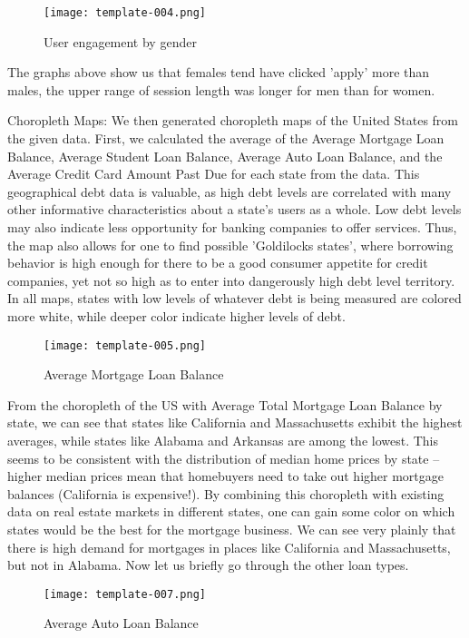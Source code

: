 \documentclass[11pt]{llncs}
\begin{document}
\begin{figure}
\begin{center}
\texttt{[image: template-004.png]}
\caption{User engagement by gender}
\end{center}
\end{figure}

The graphs above show us that females tend have clicked 'apply' more than males, the upper range of session length was longer for men than for women.

\bigbreak
{\Large Choropleth Maps:}
We then generated choropleth maps of the United States from the given data. First, we calculated the average of the Average Mortgage Loan Balance, Average Student Loan Balance, Average Auto Loan Balance, and the Average Credit Card Amount Past Due for each state from the data. This geographical debt data is valuable, as high debt levels are correlated with many other  informative characteristics about a state’s users as a whole. Low debt levels may also indicate less opportunity for banking companies to offer services. Thus, the map also allows for one to find possible 'Goldilocks states', where borrowing behavior is high enough for there to be a good consumer appetite for credit companies, yet not so high as to enter into dangerously high debt level territory. In all maps, states with low levels of whatever debt is being measured are colored more white, while deeper color indicate higher levels of debt.
\begin{figure}[H]
\begin{center}
\texttt{[image: template-005.png]}
\caption{Average Mortgage Loan Balance}
\end{center}
\end{figure}
From the choropleth of the US with Average Total Mortgage Loan Balance by state, we can see that states like California and Massachusetts exhibit the highest averages, while states like Alabama and Arkansas are among the lowest. This seems to be consistent with the distribution of median home prices by state -- higher median prices mean that homebuyers need to take out higher mortgage balances (California is expensive!). By combining this choropleth with existing data on real estate markets in different states, one can gain some color on which states would be the best for the mortgage business. We can see very plainly that there is high demand for mortgages in places like California and Massachusetts, but not in Alabama. Now let us briefly go through the other loan types.
\begin{figure}[H]
\begin{center}
\texttt{[image: template-007.png]}
\caption{Average Auto Loan Balance}
\end{center}
\end{figure}
\end{document}
